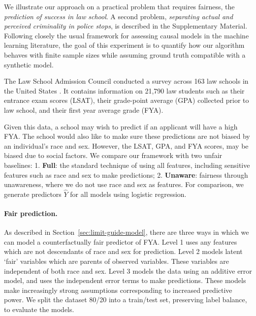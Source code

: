 We illustrate our approach on a practical problem that requires
fairness, the \emph{prediction of success in law school}. A second
problem, \emph{separating actual and perceived criminality in police
  stops}, is described in the Supplementary Material. Following closely the
usual framework for assessing causal models in the machine learning
literature, the goal of this experiment is to quantify how our
algorithm behaves with finite sample sizes while assuming ground truth compatible
with a synthetic model.


The Law School Admission Council
conducted a survey across 163 law
schools in the United States \cite{wightman1998lsac}. %
It contains information on 21,790 law students such as their entrance
exam scores (LSAT), their grade-point average (GPA) collected prior to
law school, and their first year average grade (FYA).

Given this data, a school may wish to predict if an applicant will
have a high FYA.
The school would also like to make sure these
predictions are not biased by an individual's race and sex. However,
the LSAT, GPA, and FYA scores, may be biased due to social factors. %
We compare our framework with two unfair baselines: 1. \textbf{Full}:
the standard technique of using all features, including sensitive
features such as race and sex to make predictions;
2. \textbf{Unaware}: fairness through unawareness, where we do not use
race and sex as features. For comparison, we generate predictors $\hat
Y$ for all models using logistic regression.


\paragraph{Fair prediction.}
As described in Section~\ref{sec:limit-guide-model}, there are three
ways in which we can model a counterfactually fair predictor of
FYA. Level 1 uses any features which are not descendants of race and
sex for prediction. Level 2 models latent `fair' variables which are
parents of observed variables. These variables are independent of both
race and sex. Level 3 models the data using an additive error model,
and uses the independent error terms to make predictions. These models
make increasingly strong assumptions corresponding to increased
predictive power. We split the dataset 80/20 into a train/test set,
preserving label balance, to evaluate the models.

